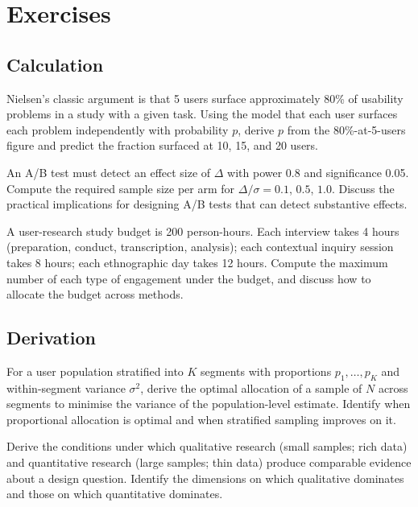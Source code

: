\section{Exercises}

\subsection*{Calculation}

\begin{exercise}
Nielsen's classic argument is that 5 users surface approximately 80\% of usability problems in a study with a given task. Using the model that each user surfaces each problem independently with probability $p$, derive $p$ from the 80\%-at-5-users figure and predict the fraction surfaced at 10, 15, and 20 users.
\end{exercise}

\begin{exercise}
An A/B test must detect an effect size of $\Delta$ with power 0.8 and significance 0.05. Compute the required sample size per arm for $\Delta / \sigma = 0.1$, $0.5$, $1.0$. Discuss the practical implications for designing A/B tests that can detect substantive effects.
\end{exercise}

\begin{exercise}
A user-research study budget is 200 person-hours. Each interview takes 4 hours (preparation, conduct, transcription, analysis); each contextual inquiry session takes 8 hours; each ethnographic day takes 12 hours. Compute the maximum number of each type of engagement under the budget, and discuss how to allocate the budget across methods.
\end{exercise}

\subsection*{Derivation}

\begin{exercise}
For a user population stratified into $K$ segments with proportions $p_1, \ldots, p_K$ and within-segment variance $\sigma^2$, derive the optimal allocation of a sample of $N$ across segments to minimise the variance of the population-level estimate. Identify when proportional allocation is optimal and when stratified sampling improves on it.
\end{exercise}

\begin{exercise}
Derive the conditions under which qualitative research (small samples; rich data) and quantitative research (large samples; thin data) produce comparable evidence about a design question. Identify the dimensions on which qualitative dominates and those on which quantitative dominates.
\end{exercise}

